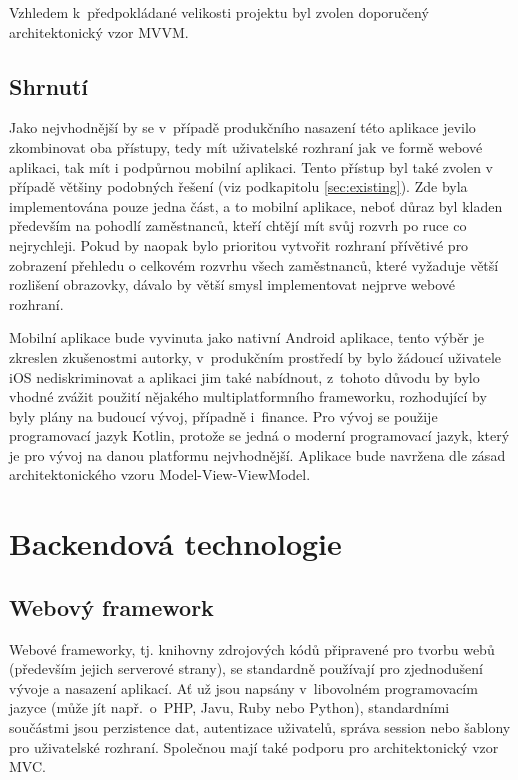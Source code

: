 \documentclass[twoside]{ctuthesis}
\begin{document}

Vzhledem k~předpokládané velikosti projektu byl zvolen doporučený architektonický vzor MVVM.

\subsection{Shrnutí}

Jako nejvhodnější by se v~případě produkčního nasazení této aplikace jevilo zkombinovat oba přístupy, tedy mít uživatelské rozhraní jak ve formě webové aplikaci, tak mít i podpůrnou mobilní aplikaci. Tento přístup byl také zvolen v případě většiny podobných řešení (viz podkapitolu \ref{sec:existing}). Zde byla implementována pouze jedna část, a to mobilní aplikace, neboť důraz byl kladen především na pohodlí zaměstnanců, kteří chtějí mít svůj rozvrh po ruce co nejrychleji. Pokud by naopak bylo prioritou vytvořit rozhraní přívětivé pro zobrazení přehledu o celkovém rozvrhu všech zaměstnanců, které vyžaduje větší rozlišení obrazovky, dávalo by větší smysl implementovat nejprve webové rozhraní.

Mobilní aplikace bude vyvinuta jako nativní Android aplikace, tento výběr je zkreslen zkušenostmi autorky, v~produkčním prostředí by bylo žádoucí uživatele iOS nediskriminovat a aplikaci jim také nabídnout, z~tohoto důvodu by bylo vhodné zvážit použití nějakého multiplatformního frameworku, rozhodující by byly plány na budoucí vývoj, případně i~finance. Pro vývoj se použije programovací jazyk Kotlin, protože se jedná o moderní programovací jazyk, který je pro vývoj na danou platformu nejvhodnější. Aplikace bude navržena dle zásad architektonického vzoru Model-View-ViewModel.


\section{Backendová technologie}

\subsection{Webový framework}

Webové frameworky, tj. knihovny zdrojových kódů připravené pro tvorbu webů (především jejich serverové strany), se standardně používají pro zjednodušení vývoje a nasazení aplikací. Ať už jsou napsány v~libovolném programovacím jazyce (může jít např.~o~PHP, Javu, Ruby nebo Python), standardními součástmi jsou perzistence dat, autentizace uživatelů, správa session nebo šablony pro uživatelské rozhraní. Společnou mají také podporu pro architektonický vzor MVC. \cite{docforge2014web}
\end{document}
